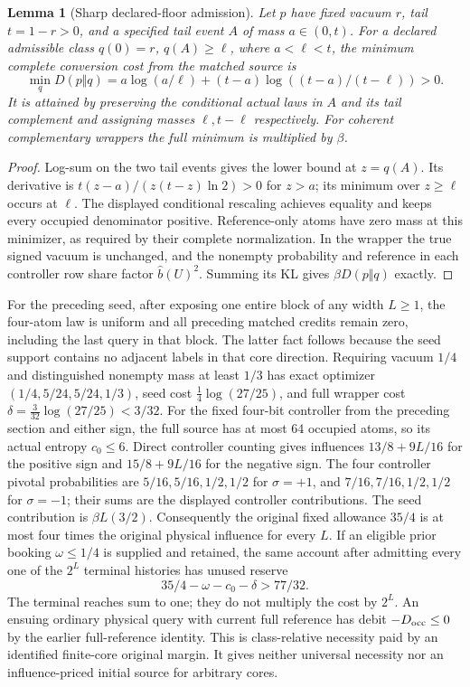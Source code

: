 \documentclass[11pt]{article}
\newtheorem{lemma}{Lemma}
\begin{document}
\begin{lemma}[Sharp declared-floor admission]\label{lem:v10floor}
Let $p$ have fixed vacuum $r$, tail $t=1-r>0$, and a specified tail event
$A$ of mass $a\in(0,t)$. For a declared admissible class
$q(0)=r$, $q(A)\ge\ell$, where $a<\ell<t$, the minimum complete
conversion cost from the matched source is
\[
 \min_qD(p\Vert q)
 =a\log(a/\ell)+(t-a)\log((t-a)/(t-\ell))>0.
\]
It is attained by preserving the conditional actual laws in $A$ and
its tail complement and assigning masses $\ell,t-\ell$ respectively.
For coherent complementary wrappers the full minimum is multiplied
by $\beta$.
\end{lemma}
\begin{proof}
Log-sum on the two tail events gives the lower bound at $z=q(A)$.
Its derivative is $t(z-a)/(z(t-z)\ln2)>0$ for $z>a$; its minimum
over $z\ge\ell$ occurs at $\ell$. The displayed conditional rescaling
achieves equality and keeps every occupied denominator positive.
Reference-only atoms have zero mass at this minimizer, as required by
their complete normalization. In the wrapper the true signed vacuum
is unchanged, and the nonempty probability and reference in each
controller row share factor $\widehat b(U)^2$. Summing its KL gives
$\beta D(p\Vert q)$ exactly.
\end{proof}

For the preceding seed, after exposing one entire block of any width
$L\ge1$, the four-atom law is uniform and all preceding matched
credits remain zero, including the last query in that block. The latter
fact follows because the seed support contains no adjacent labels in
that core direction. Requiring vacuum $1/4$ and distinguished
nonempty mass at least $1/3$ has exact optimizer
$(1/4,5/24,5/24,1/3)$, seed cost $\frac14\log(27/25)$, and full
wrapper cost $\delta=\frac3{32}\log(27/25)<3/32$.
For the fixed four-bit controller from the preceding section and either
sign, the full source has at most $64$ occupied atoms, so its actual
entropy $c_0\le6$. Direct controller counting gives influences
$13/8+9L/16$ for the positive sign and $15/8+9L/16$ for the negative
sign. The four controller pivotal probabilities are
$5/16,5/16,1/2,1/2$ for $\sigma=+1$, and
$7/16,7/16,1/2,1/2$ for $\sigma=-1$; their sums are the displayed
controller contributions. The seed contribution is $\beta L(3/2)$.
Consequently the original fixed allowance $35/4$ is at most four times
the original physical influence for every $L$. If an eligible prior
booking $\omega\le1/4$ is supplied and retained, the same account after
admitting every one of the $2^L$ terminal histories has unused reserve
\[
 35/4-\omega-c_0-\delta>77/32.
\]
The terminal reaches sum to one; they do not multiply the cost by
$2^L$. An ensuing ordinary physical query with current full reference
has debit $-D_{\rm occ}\le0$ by the earlier full-reference identity.
This is class-relative necessity paid by an identified finite-core
original margin. It gives neither universal necessity nor an
influence-priced initial source for arbitrary cores.
\end{document}
